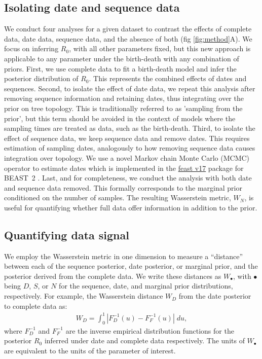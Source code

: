\documentclass{article}
\begin{document}
\subsection*{Isolating date and sequence data}
We conduct four analyses for a given dataset to contrast the effects of complete data, date data, sequence data, and the absence of both (fig \ref{fig:method}A). We focus on inferring $R_{0}$, with all other parameters fixed, but this new approach is applicable to any parameter under the birth-death with any combination of priors. First, we use complete data to fit a birth-death model and infer the posterior distribution of $R_{0}$. This represents the combined effects of dates and sequences. Second, to isolate the effect of date data, we repeat this analysis after removing sequence information and retaining dates, thus integrating over the prior on tree topology. This is traditionally referred to as 'sampling from the prior', but this term should be avoided in the context of models where the sampling times are treated as data, such as the birth-death. Third, to isolate the effect of sequence data, we keep sequence data and remove dates. This requires estimation of sampling dates, analogously to how removing sequence data causes integration over topology. We use a novel Markov chain Monte Carlo (MCMC) operator to estimate dates which is implemented in the \href{https://github.com/tgvaughan/feast}{feast v17} package for BEAST~2 \citep{bouckaert_beast_2019}. Last, and for completeness, we conduct the analysis with both date and sequence data removed. This formally corresponds to the marginal prior conditioned on the number of samples. The resulting Wasserstein metric, $W_N$, is useful for quantifying whether full data offer information in addition to the prior.
\subsection*{Quantifying data signal}
We  employ the Wasserstein metric in one dimension to measure a ``distance'' between each of the sequence posterior, date posterior, or marginal prior, and the posterior derived from the complete data. We write these distances as $W_{\bullet}$, with $\bullet$ being $D$, $S$, or $N$ for the sequence, date, and marginal prior distributions, respectively.  For example, the Wasserstein distance $W_D$ from the date posterior to complete data as:
\begin{align*}
W_D = \int_0^1 |F_{D}^{-1}(u)-F_{F}^{-1}(u)| \; du, 
\end{align*}
where $F_{D}^{-1}$ and $F_{F}^{-1}$ are the inverse empirical distribution functions for the posterior $R_{0}$ inferred under date and complete data respectively. The units of $W_{\bullet}$ are equivalent to the units of the parameter of interest.
\end{document}
